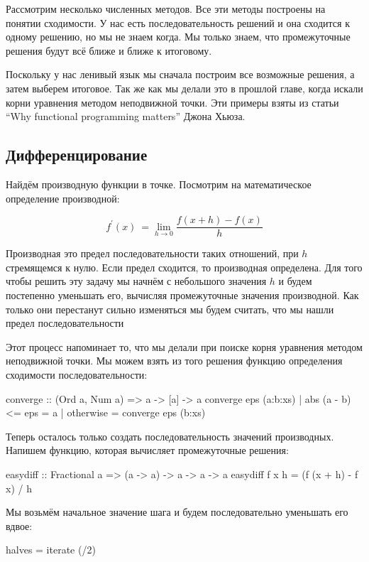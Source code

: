 Рассмотрим несколько численных методов. Все эти методы построены на
понятии сходимости. У нас есть последовательность решений и она сходится
к одному решению, но мы не знаем когда. Мы только знаем, что
промежуточные решения будут всё ближе и ближе к итоговому.

Поскольку у нас ленивый язык мы сначала построим все возможные решения,
а затем выберем итоговое. Так же как мы делали это в прошлой главе,
когда искали корни уравнения методом неподвижной точки. Эти примеры
взяты из статьи ``Why functional programming matters'' Джона Хьюза.

\subsection{Дифференцирование}

Найдём производную функции в точке. Посмотрим на математическое
определение производной:

\[f^\prime(x)\ =\lim_{h\to0}\frac{f(x+h)-f(x)}{h}\]

Производная это предел последовательности таких отношений, при $h$
стремящемся к нулю. Если предел сходится, то производная определена. Для
того чтобы решить эту задачу мы начнём с небольшого значения $h$ и будем
постепенно уменьшать его, вычисляя промежуточные значения производной.
Как только они перестанут сильно изменяться мы будем считать, что мы
нашли предел последовательности

Этот процесс напоминает то, что мы делали при поиске корня уравнения
методом неподвижной точки. Мы можем взять из того решения функцию
определения сходимости последовательности:


\begin{code}
converge :: (Ord a, Num a) => a -> [a] -> a
converge eps (a:b:xs) 
    | abs (a - b) <= eps    = a
    | otherwise             = converge eps (b:xs)
\end{code}

Теперь осталось только создать последовательность значений производных.
Напишем функцию, которая вычисляет промежуточные решения:


\begin{code}
easydiff :: Fractional a => (a -> a) -> a -> a -> a
easydiff f x h = (f (x + h) - f x) / h
\end{code}

Мы возьмём начальное значение шага и будем последовательно уменьшать его
вдвое:


\begin{code}
halves = iterate (/2) 
\end{code}

